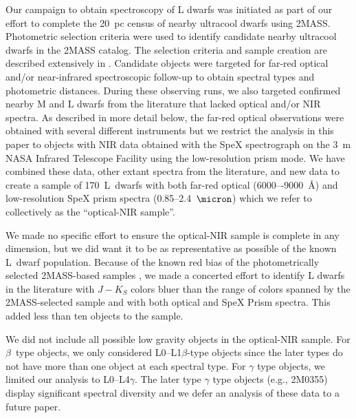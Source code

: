 \documentclass[12pt,preprint]{aastex}
\newcommand{\sample}{170}
\begin{document}
Our campaign to obtain spectroscopy of L dwarfs was initiated as part of our effort to complete the 20~pc census of nearby ultracool dwarfs using 2MASS.
Photometric selection criteria were used to identify candidate nearby ultracool dwarfs in the 2MASS catalog.
The selection criteria and sample creation are described extensively in \cite[Papers~III, V, and IX]{Cruz03,Cruz07,Reid08}.
Candidate objects were targeted for far-red optical and/or near-infrared spectroscopic follow-up to obtain spectral types and photometric distances.
During these observing runs, we also targeted confirmed nearby M and L dwarfs from the literature that lacked optical and/or NIR spectra.
As described in more detail below, the far-red optical observations were obtained with several different instruments but we restrict the analysis in this paper to objects with NIR data obtained with the SpeX spectrograph \citep{Spex} on the 3~m NASA Infrared Telescope Facility using the low-resolution prism mode.
We have combined these data, other extant spectra from the literature, and new data to create a sample of \sample~L~dwarfs with both far-red optical (6000–-9000~\AA) and low-resolution SpeX prism spectra (0.85--2.4~$\micron$) which we refer to collectively as the ``optical-NIR sample''.

We made no specific effort to ensure the optical-NIR sample is complete in any dimension, but we did want it to be as representative as possible of the known L~dwarf population.
Because of the known red bias of the photometrically selected 2MASS-based samples \cite[Figure 3]{Schmidt10}, we made a concerted effort to identify L dwarfs in the literature with $J-K_S$ colors bluer than the range of colors spanned by the 2MASS-selected sample and with both optical and SpeX Prism spectra.
This added less than ten objects to the sample.

We did not include all possible low gravity objects in the optical-NIR sample.
For $\beta$~type objects, we only considered L0--L1$\beta$-type objects since the later types do not have more than one object at each spectral type.
For $\gamma$ type objects, we limited our analysis to L0--L4$\gamma$.
The later type $\gamma$ type objects (e.g., 2M0355) display significant spectral diversity and we defer an analysis of these data to a future paper.
\end{document}
